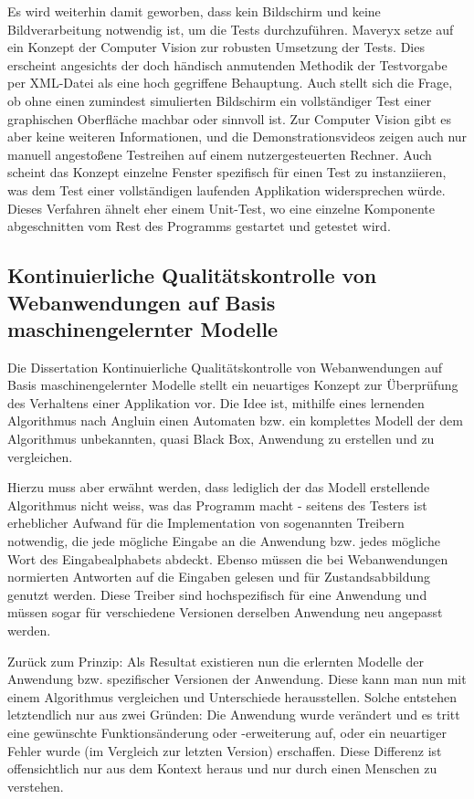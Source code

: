 Es wird weiterhin damit geworben, dass kein Bildschirm und keine Bildverarbeitung
notwendig ist, um die Tests durchzuführen. Maveryx setze auf ein 
Konzept der \glqq{}Computer Vision\grqq{} zur robusten Umsetzung der
Tests. Dies erscheint angesichts der doch händisch anmutenden Methodik
der Testvorgabe per XML-Datei als eine hoch gegriffene Behauptung. Auch stellt
sich die Frage, ob ohne einen zumindest simulierten Bildschirm ein vollständiger
Test einer graphischen Oberfläche machbar oder sinnvoll ist. Zur Computer
Vision gibt es aber keine weiteren Informationen, und die Demonstrationsvideos
zeigen auch nur manuell angestoßene Testreihen auf einem nutzergesteuerten Rechner.
Auch scheint das Konzept einzelne Fenster spezifisch für einen Test zu instanziieren,
was dem Test einer vollständigen laufenden Applikation widersprechen würde. Dieses
Verfahren ähnelt eher einem Unit-Test, wo eine einzelne Komponente abgeschnitten
vom Rest des Programms gestartet und getestet wird.


\vspace{0.5cm}

\subsection{Kontinuierliche Qualitätskontrolle von Webanwendungen auf Basis 
maschinengelernter Modelle}\label{ssection:windmueller}


Die \glqq{}Dissertation Kontinuierliche Qualitätskontrolle von Webanwendungen auf 
Basis maschinengelernter Modelle\grqq{} \cite{diss:windmueller} stellt ein neuartiges Konzept
zur Überprüfung des Verhaltens einer Applikation vor. Die Idee ist, mithilfe eines
lernenden Algorithmus nach Angluin \cite{angluin} einen Automaten bzw. ein komplettes Modell
der dem Algorithmus unbekannten, quasi \glqq{}Black Box\grqq{}, Anwendung zu erstellen und zu vergleichen.

Hierzu muss aber erwähnt werden, dass lediglich der das Modell erstellende Algorithmus nicht
weiss, was das Programm macht - seitens des Testers ist erheblicher Aufwand für die Implementation
von sogenannten Treibern notwendig, die jede mögliche Eingabe an die Anwendung bzw. jedes
mögliche Wort des Eingabealphabets abdeckt. Ebenso müssen die bei Webanwendungen normierten
Antworten auf die Eingaben gelesen und für Zustandsabbildung genutzt werden. Diese Treiber
sind hochspezifisch für eine Anwendung und müssen sogar für verschiedene Versionen derselben
Anwendung neu angepasst werden.

Zurück zum Prinzip: Als Resultat existieren nun die erlernten Modelle der Anwendung bzw. spezifischer
Versionen der Anwendung. Diese kann man nun mit einem Algorithmus vergleichen und Unterschiede
herausstellen. Solche entstehen letztendlich nur aus zwei Gründen: Die Anwendung wurde verändert
und es tritt eine gewünschte Funktionsänderung oder -erweiterung auf, oder ein neuartiger Fehler
wurde (im Vergleich zur letzten Version) erschaffen. Diese Differenz ist offensichtlich nur
aus dem Kontext heraus und nur durch einen Menschen zu verstehen.

